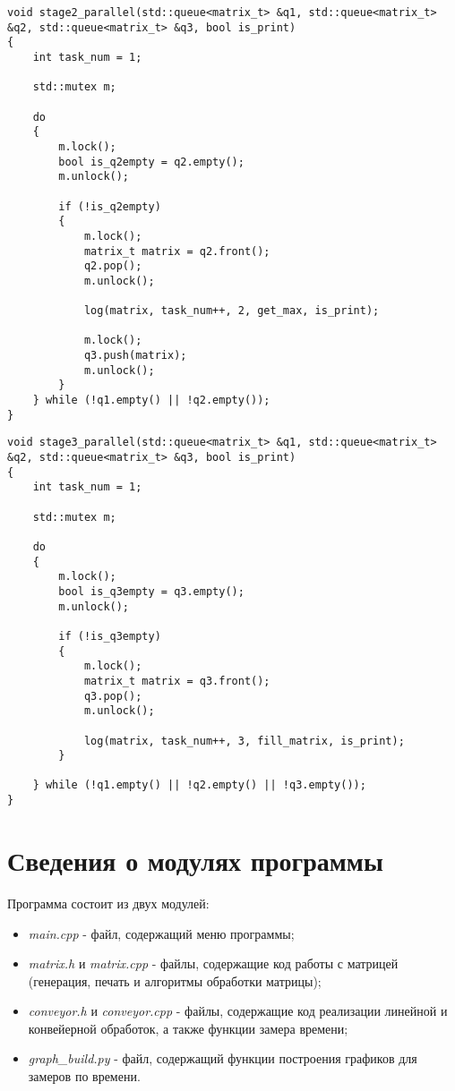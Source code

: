 \begin{center}
    \captionsetup{justification=raggedright,singlelinecheck=off}
    \begin{lstlisting}[label=lst:no_par_alg,caption=Алгоритм запуска 2 потока для нахождения максимального элемента матрицы]
void stage2_parallel(std::queue<matrix_t> &q1, std::queue<matrix_t> &q2, std::queue<matrix_t> &q3, bool is_print)
{
	int task_num = 1;

	std::mutex m;

	do
	{   
		m.lock();
		bool is_q2empty = q2.empty();
		m.unlock();

		if (!is_q2empty)
		{   
			m.lock();
			matrix_t matrix = q2.front();
			q2.pop();
			m.unlock();

			log(matrix, task_num++, 2, get_max, is_print);

			m.lock();
			q3.push(matrix);
			m.unlock();
		}
	} while (!q1.empty() || !q2.empty());
}
\end{lstlisting}
\end{center}

\clearpage

\begin{center}
    \captionsetup{justification=raggedright,singlelinecheck=off}
    \begin{lstlisting}[label=lst:no_par_alg,caption=Алгоритм запуска 3 потока для заполнения матрицы вычисленными значениями]
void stage3_parallel(std::queue<matrix_t> &q1, std::queue<matrix_t> &q2, std::queue<matrix_t> &q3, bool is_print)
{
	int task_num = 1;

	std::mutex m;

	do
	{
		m.lock();
		bool is_q3empty = q3.empty();
		m.unlock();

		if (!is_q3empty)
		{
			m.lock();
            matrix_t matrix = q3.front(); 
            q3.pop();
            m.unlock();

			log(matrix, task_num++, 3, fill_matrix, is_print);
		}

	} while (!q1.empty() || !q2.empty() || !q3.empty());
}
\end{lstlisting}
\end{center}

\section{Сведения о модулях программы}
Программа состоит из двух модулей:
\begin{itemize}
	\item \textit{main.cpp} - файл, содержащий меню программы;
    \item \textit{matrix.h} и \textit{matrix.cpp} - файлы, содержащие код работы с матрицей (генерация, печать и алгоритмы обработки матрицы);
	\item \textit{conveyor.h} и \textit{conveyor.cpp} - файлы, содержащие код реализации линейной и конвейерной обработок, а также функции замера времени;
	\item \textit{graph\_build.py} - файл, содержащий функции построения графиков для замеров по времени.
\end{itemize}


